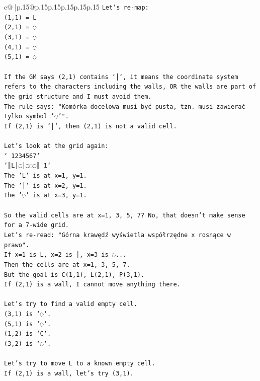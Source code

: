 \documentclass{article}
\begin{document}
{\begin{supertabular}{c@{$\;$}|p{.15\linewidth}@{}p{.15\linewidth}p{.15\linewidth}p{.15\linewidth}p{.15\linewidth}p{.15\linewidth}}
{{{\texttt{Let's re{-}map:} \\
\texttt{(1,1) = L} \\
\texttt{(2,1) = ◌} \\
\texttt{(3,1) = ◌} \\
\texttt{(4,1) = ◌} \\
\texttt{(5,1) = ◌} \\
\\ 
\texttt{If the GM says (2,1) contains `│`, it means the coordinate system refers to the characters including the walls, OR the walls are part of the grid structure and I must avoid them.} \\
\texttt{The rule says: "Komórka docelowa musi być pusta, tzn. musi zawierać tylko symbol '◌'".} \\
\texttt{If (2,1) is `│`, then (2,1) is not a valid cell.} \\
\\ 
\texttt{Let's look at the grid again:} \\
\texttt{` 1234567`} \\
\texttt{`║L│◌│◌◌◌║ 1`} \\
\texttt{The 'L' is at x=1, y=1.} \\
\texttt{The '│' is at x=2, y=1.} \\
\texttt{The '◌' is at x=3, y=1.} \\
\\ 
\texttt{So the valid cells are at x=1, 3, 5, 7? No, that doesn't make sense for a 7{-}wide grid.} \\
\texttt{Let's re{-}read: "Górna krawędź wyświetla współrzędne x rosnące w prawo".} \\
\texttt{If x=1 is L, x=2 is │, x=3 is ◌...} \\
\texttt{Then the cells are at x=1, 3, 5, 7.} \\
\texttt{But the goal is C(1,1), L(2,1), P(3,1).} \\
\texttt{If (2,1) is a wall, I cannot move anything there.} \\
\\ 
\texttt{Let's try to find a valid empty cell.} \\
\texttt{(3,1) is `◌`.} \\
\texttt{(5,1) is `◌`.} \\
\texttt{(1,2) is `C`.} \\
\texttt{(3,2) is `◌`.} \\
\\ 
\texttt{Let's try to move L to a known empty cell.} \\
\texttt{If (2,1) is a wall, let's try (3,1).} \\
}}}
\end{supertabular}}
\end{document}
